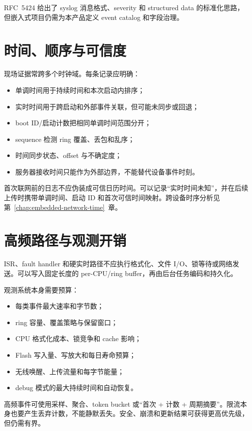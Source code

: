 RFC~5424 给出了 syslog 消息格式、severity 和 structured data 的标准化思路\cite{rfc5424}，但嵌入式项目仍需为本产品定义 event catalog 和字段治理。

\section{时间、顺序与可信度}

现场证据常跨多个时钟域。每条记录应明确：

\begin{itemize}
  \item 单调时间用于持续时间和本次启动内排序；
  \item 实时时间用于跨启动和外部事件关联，但可能未同步或回退；
  \item boot ID/启动计数把相同单调时间范围分开；
  \item sequence 检测 ring 覆盖、丢包和乱序；
  \item 时间同步状态、offset 与不确定度；
  \item 服务器接收时间只能作为外部边界，不能替代设备事件时刻。
\end{itemize}

首次联网前的日志不应伪装成可信日历时间。可以记录“实时时间未知”，并在后续上传时携带单调时间、启动 ID 和首次可信时间映射。跨设备时序分析见第~\ref{chap:embedded-network-time}~章。

\section{高频路径与观测开销}

ISR、fault handler 和硬实时路径不应执行格式化、文件 I/O、锁等待或网络发送。可以写入固定长度的 per-CPU/ring buffer，再由后台任务编码和持久化。

观测系统本身需要预算：

\begin{itemize}
  \item 每类事件最大速率和字节数；
  \item ring 容量、覆盖策略与保留窗口；
  \item CPU 格式化成本、锁竞争和 cache 影响；
  \item Flash 写入量、写放大和每日寿命预算；
  \item 无线唤醒、上传流量和每字节能量；
  \item debug 模式的最大持续时间和自动恢复。
\end{itemize}

高频事件可使用采样、聚合、token bucket 或“首次 + 计数 + 周期摘要”。限流本身也要产生丢弃计数，不能静默丢失。安全、崩溃和更新结果可获得更高优先级，但仍需有界。

